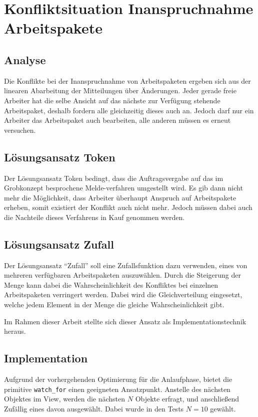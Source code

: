 \section{Konfliktsituation Inanspruchnahme Arbeitspakete}
\subsection{Analyse}
Die Konflikte bei der Inanspruchnahme von Arbeitspaketen ergeben sich aus der linearen Abarbeitung der Mitteilungen über Änderungen.
Jeder gerade freie Arbeiter hat die selbe Ansicht auf das nächste zur Verfügung stehende Arbeitspaket, deshalb fordern alle gleichzeitig dieses auch an.
Jedoch darf nur ein Arbeiter das Arbeitspaket auch bearbeiten,
alle anderen müssen es erneut versuchen.

\subsection{Lösungsansatz Token}
Der Lösungsansatz Token bedingt, dass die Auftragsvergabe auf das im Grobkonzept besprochene Melde-verfahren umgestellt wird.
Es gib dann nicht mehr die Möglichkeit, dass Arbeiter überhaupt Anspruch auf Arbeitspakete erheben, somit existiert der Konflikt auch nicht mehr.
Jedoch müssen dabei auch die Nachteile dieses Verfahrens in Kauf genommen werden.

\subsection{Lösungsansatz Zufall}

Der Lösungsansatz ``Zufall'' soll eine Zufallsfunktion dazu verwenden,
eines von mehreren verfügbaren Arbeitspaketen auszuwählen.
Durch die Steigerung der Menge kann dabei die Wahrscheinlichkeit des Konfliktes bei einzelnen Arbeitspaketen verringert werden. Dabei wird die Gleichverteilung eingesetzt, welche jedem Element in der Menge die gleiche Wahrscheinlichkeit gibt.

Im Rahmen dieser Arbeit stellte sich dieser Ansatz als Implementationstechnik heraus.


\subsection{Implementation}

Aufgrund der vorhergehenden Optimierung für die Anlaufphase,
bietet die primitive \verb|watch_for| einen geeigneten Ansatzpunkt.
Anstelle des nächsten Objektes im View, werden die nächsten $N$ Objekte erfragt,
und anschließend Zufällig eines davon ausgewählt.
Dabei wurde in den Tests $N = 10$ gewählt.

